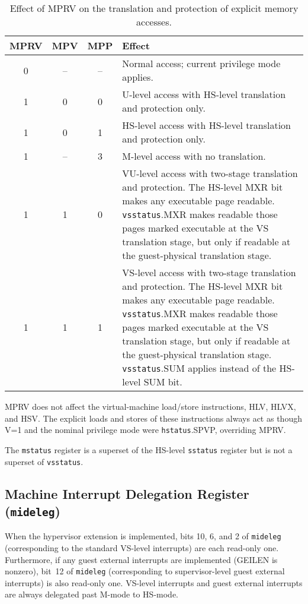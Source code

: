 \begin{table*}[h!]
\begin{center}
\begin{tabular}{|c|c|c||p{4.5in}|}
  \hline
   MPRV & MPV & MPP & Effect \\ \hline \hline
   0    & --  & --  & Normal access; current privilege mode applies. \\ \hline
   1    & 0   & 0   & U-level access with HS-level translation and protection only. \\ \hline
   1    & 0   & 1   & HS-level access with HS-level translation and protection only.  \\ \hline
   1    & --  & 3   & M-level access with no translation. \\ \hline
   1    & 1   & 0   & VU-level access with two-stage translation and protection. The HS-level MXR bit makes any executable page readable.  {\tt vsstatus}.MXR makes readable those pages marked executable at the VS translation stage, but only if readable at the guest-physical translation stage. \\ \hline
   1    & 1   & 1   & VS-level access with two-stage translation and protection. The HS-level MXR bit makes any executable page readable.  {\tt vsstatus}.MXR makes readable those pages marked executable at the VS translation stage, but only if readable at the guest-physical translation stage.  {\tt vsstatus}.SUM applies instead of the HS-level SUM bit. \\ \hline
 \end{tabular}
\end{center}
\caption{Effect of MPRV on the translation and protection of explicit
memory accesses.}
\label{h-mprv}
\end{table*}

MPRV does not affect the virtual-machine load/store instructions, HLV,
HLVX, and HSV.
The explicit loads and stores of these instructions always act as though
V=1 and the nominal privilege mode were {\tt hstatus}.SPVP, overriding MPRV.

The {\tt mstatus} register is a superset of the HS-level {\tt sstatus}
register but is not a superset of {\tt vsstatus}.

\FloatBarrier

\subsection{Machine Interrupt Delegation Register ({\tt mideleg})}

When the hypervisor extension is implemented, bits 10, 6, and 2 of
{\tt mideleg} (corresponding to the standard VS-level interrupts) are
each read-only one.
Furthermore, if any guest external interrupts are implemented (GEILEN is
nonzero), bit~12 of {\tt mideleg} (corresponding to supervisor-level
guest external interrupts) is also read-only one.
VS-level interrupts and guest external interrupts are always delegated
past M-mode to HS-mode.

